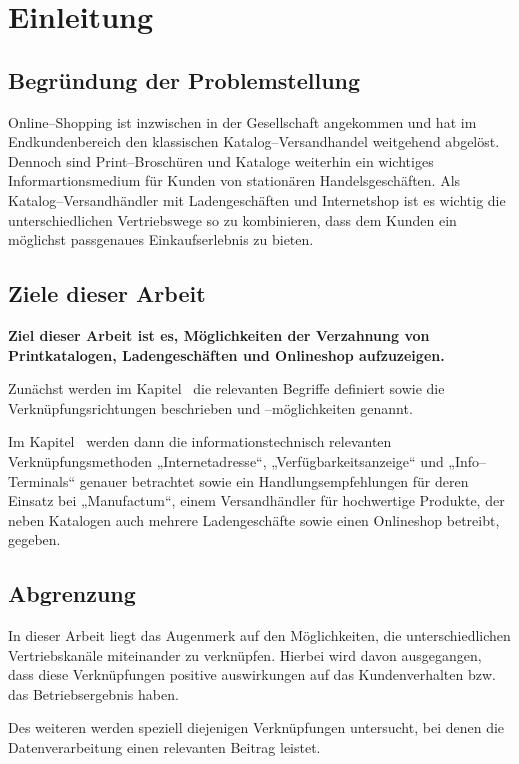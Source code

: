 \section{Einleitung}
\label{sec:einleitung}

\subsection{Begründung der Problemstellung}

Online--Shopping ist inzwischen in der Gesellschaft angekommen und hat im Endkundenbereich den klassischen Katalog--Versandhandel weitgehend abgelöst. Dennoch sind Print--Broschüren und Kataloge weiterhin ein wichtiges Informartionsmedium für Kunden von stationären Handelsgeschäften. Als Katalog--Versandhändler mit Ladengeschäften und Internetshop ist es wichtig die unterschiedlichen Vertriebswege so zu kombinieren, dass dem Kunden ein möglichst passgenaues Einkaufserlebnis zu bieten.

\subsection{Ziele dieser Arbeit}

\textbf{Ziel dieser Arbeit ist es, Möglichkeiten der Verzahnung von Printkatalogen, Ladengeschäften und Onlineshop aufzuzeigen.}

Zunächst werden im Kapitel~ die relevanten Begriffe definiert sowie die Verknüpfungsrichtungen beschrieben und --möglichkeiten genannt.

Im Kapitel~ werden dann die informationstechnisch relevanten Verknüpfungsmethoden „Internetadresse“, „Verfügbarkeitsanzeige“ und „Info--Terminals“ genauer betrachtet sowie ein Handlungsempfehlungen für deren Einsatz bei „Manufactum“, einem Versandhändler für hochwertige Produkte, der neben Katalogen auch mehrere Ladengeschäfte sowie einen Onlineshop betreibt, gegeben.

\subsection{Abgrenzung}

In dieser Arbeit liegt das Augenmerk auf den Möglichkeiten, die unterschiedlichen Vertriebskanäle miteinander zu verknüpfen. Hierbei wird davon ausgegangen, dass diese Verknüpfungen positive auswirkungen auf das Kundenverhalten bzw. das Betriebsergebnis haben. 

Des weiteren werden speziell diejenigen Verknüpfungen untersucht, bei denen die Datenverarbeitung einen relevanten Beitrag leistet.


